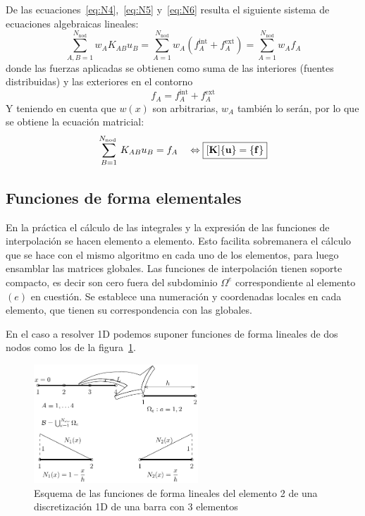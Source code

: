 De las ecuaciones~\eqref{eq:N4},~\eqref{eq:N5} y~\eqref{eq:N6} resulta el siguiente sistema de ecuaciones algebraicas lineales:
\begin{equation}\label{eq:N7}
\sum_{A, B=1}^{N_{\mathrm{nod}}} w_{A} K_{A B} u_{B}=\sum_{A=1}^{N_{\mathrm{nod}}} w_{A}\left(f_{A}^{\mathrm{int}}+f_{A}^{\mathrm{ext}}\right)=\sum_{A=1}^{N_{\mathrm{nod}}} w_{A} f_{A}
\end{equation}
donde las fuerzas aplicadas se obtienen como suma de las
interiores (fuentes distribuidas) y las exteriores en el contorno
$$
f_{A}=f_{A}^{\mathrm{int}}+f_{A}^{\mathrm{ext}}
$$
Y teniendo en cuenta que $w(x)$ son arbitrarias, $w_{A}$ también lo
serán, por lo que se obtiene la ecuación matricial:
\begin{equation}\label{eq:N8}
\sum_{B=1}^{N_{\text {nod }}} K_{A B} u_{B}=f_{A} \quad \Leftrightarrow \fbox{$\displaystyle [\mathbf{K}]\{\mathbf{u}\}=\{\mathbf{f}\}$}
\end{equation}

\subsection{Funciones de forma elementales}
\label{sec:N_e}
En la práctica el cálculo de las integrales y la expresión de las
funciones de interpolación se hacen elemento a elemento. Esto
facilita sobremanera el cálculo que se hace con el mismo
algoritmo en cada uno de los elementos, para luego ensamblar
las matrices globales. 
Las funciones de interpolación tienen soporte compacto, es
decir son cero fuera del subdominio $\Omega^{e}$ correspondiente al
elemento $(e)$ en cuestión.
Se establece una numeración y coordenadas locales en cada
elemento, que tienen su correspondencia con las globales. 

En el caso a resolver 1D podemos suponer funciones de forma lineales de dos nodos como los de la figura~\ref{fig:funciones_forma}. 

\begin{figure}[!htp]
\centering
% 
\includegraphics[width=0.55\textwidth]{figuras_1/FIG/malla1D-global-local-Nx.pdf}
\caption{Esquema de las funciones de forma lineales del elemento 2 de una discretización 1D de una barra con 3 elementos}
\label{fig:funciones_forma}
\end{figure}

